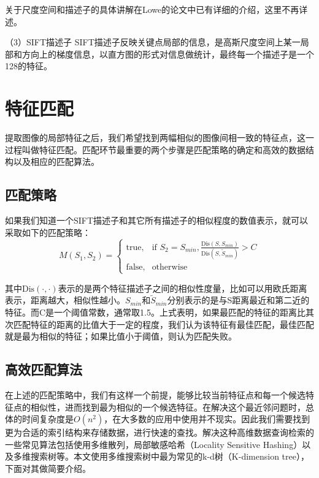 关于尺度空间和描述子的具体讲解在Lowe的论文中\cite{Lowe:2004uq}已有详细的介绍，这里不再详述。

（3）SIFT描述子
SIFT描述子反映关键点局部的信息，是高斯尺度空间上某一局部和方向上的梯度信息，以直方图的形式对信息做统计，最终每一个描述子是一个128的特征。

\section{特征匹配}
提取图像的局部特征之后，我们希望找到两幅相似的图像间相一致的特征点，这一过程叫做特征匹配。匹配环节最重要的两个步骤是匹配策略的确定和高效的数据结构以及相应的匹配算法。

\subsection{匹配策略}
如果我们知道一个SIFT描述子和其它所有描述子的相似程度的数值表示，就可以采取如下的匹配策略：
\begin{equation}
  M(S_1,S_2) = 
\begin{cases} 
\text{true}, & \mbox{if } S_2 = S_{min},\frac{\text{Dis}(S,S_{min})}{\text{Dis}(S,\tilde{S}_{min})} > C \\
\text{false}, & \mbox{otherwise}
\end{cases}
\end{equation}

其中\(\text{Dis}(\cdot,\cdot)\)表示的是两个特征描述子之间的相似性度量，比如可以用欧氏距离表示，距离越大，相似性越小。\(S_{min}\)和\(\tilde{S}_{min}\)分别表示的是与S距离最近和第二近的特征。而C是一个阈值常数，通常取1.5。上式表明，如果最匹配的特征的距离比其次匹配特征的距离的比值大于一定的程度，我们认为该特征有最佳匹配，最佳匹配就是最为相似的特征；如果比值小于阈值，则认为匹配失败。

\subsection{高效匹配算法}
在上述的匹配策略中，我们有这样一个前提，能够比较当前特征点和每一个候选特征点的相似性，进而找到最为相似的一个候选特征。在解决这个最近邻问题时，总体的时间复杂度是\(O(n^2)\)，在大多数的应用中使用并不现实。因此我们需要找到更为合适的索引结构来存储数据，进行快速的查找。解决这种高维数据查询检索的一些常见算法包括使用多维散列，局部敏感哈希（Locality Sensitive Hashing）以及多维搜索树等。本文使用多维搜索树中最为常见的k-d树（K-dimension tree），下面对其做简要介绍。

